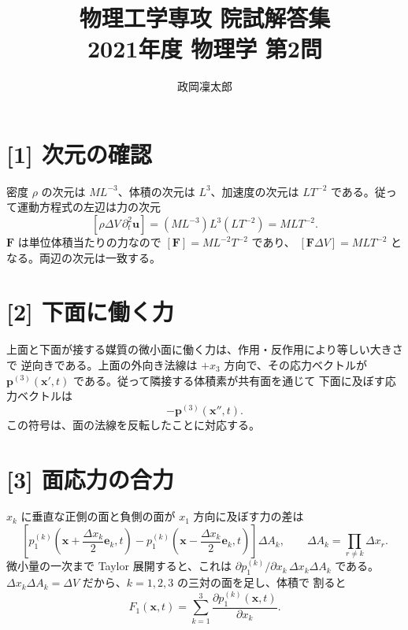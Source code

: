 \documentclass[11pt,a4paper]{article}
\title{物理工学専攻 院試解答集\\2021年度 物理学 第2問}
\author{政岡凜太郎}
\date{}
\begin{document}
\maketitle

\section*{[1] 次元の確認}
密度 $\rho$ の次元は $M L^{-3}$、体積の次元は $L^3$、加速度の次元は
$L T^{-2}$ である。従って運動方程式の左辺は力の次元
\[
 [\rho\Delta V\,\partial_t^2\boldsymbol u]
 = (ML^{-3})L^3(LT^{-2})=MLT^{-2}.
\]
$\boldsymbol F$ は単位体積当たりの力なので $[\boldsymbol F]=ML^{-2}T^{-2}$ であり、
$[\boldsymbol F\Delta V]=MLT^{-2}$ となる。両辺の次元は一致する。

\section*{[2] 下面に働く力}
上面と下面が接する媒質の微小面に働く力は、作用・反作用により等しい大きさで
逆向きである。上面の外向き法線は $+x_3$ 方向で、その応力ベクトルが
$\boldsymbol p^{(3)}(\boldsymbol x',t)$ である。従って隣接する体積素が共有面を通じて
下面に及ぼす応力ベクトルは
\begin{equation}
 -\boldsymbol p^{(3)}(\boldsymbol x'',t).
\end{equation}
この符号は、面の法線を反転したことに対応する。

\section*{[3] 面応力の合力}
$x_k$ に垂直な正側の面と負側の面が $x_1$ 方向に及ぼす力の差は
\[
 \left[p_1^{(k)}\!\left(\boldsymbol x+\frac{\Delta x_k}{2}\boldsymbol e_k,t\right)
 -p_1^{(k)}\!\left(\boldsymbol x-\frac{\Delta x_k}{2}\boldsymbol e_k,t\right)\right]
 \Delta A_k,
 \qquad \Delta A_k=\prod_{r\ne k}\Delta x_r.
\]
微小量の一次まで Taylor 展開すると、これは
$\partial p_1^{(k)}/\partial x_k\,\Delta x_k\Delta A_k$ である。
$\Delta x_k\Delta A_k=\Delta V$ だから、$k=1,2,3$ の三対の面を足し、体積で
割ると
\begin{equation}
 F_1(\boldsymbol x,t)=\sum_{k=1}^3\frac{\partial p_1^{(k)}(\boldsymbol x,t)}
                                      {\partial x_k}.
\end{equation}
\end{document}
